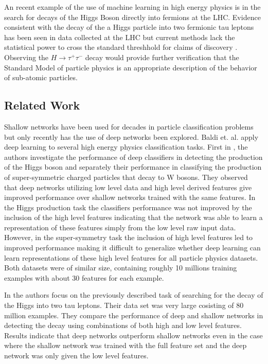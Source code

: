 \documentclass[12pt,letterpaper]{article}
\begin{document}
An recent example of the use of machine learning in high energy physics is in the search for decays of the Higgs Boson directly into fermions at the LHC.  Evidence consistent with the decay of the a Higgs particle into two fermionic tau leptons has been seen in data collected at the LHC but current methods lack the statistical power to cross the standard threshhold for claims of discovery \cite{pmlr-v42-cowa14}.  Observing the $H \rightarrow \tau^+ \tau^-$ decay would provide further verification that the Standard Model of particle physics is an appropriate description of the behavior of sub-atomic particles.

\subsection{Related Work}

Shallow networks have been used for decades in particle classification problems but only recently has the use of deep networks been explored.  Baldi et. al. \cite{Baldi:2014kfa}\cite{Baldi:2014pta} apply deep learning to several high energy physics classification tasks.  First in \cite{Baldi:2014kfa}, the authors investigate the performance of deep classifiers in detecting the production of the Higgs boson and separately their performance in classifying the production of super-symmetric charged particles that decay to W bosons.  They observed that deep networks utilizing low level data and high level derived features give improved performance over shallow networks trained with the same features.  In the Higgs production task the classifiers performance was not improved by the inclusion of the high level features indicating that the network was able to learn a representation of these features simply from the low level raw input data.  However, in the super-symmetry task the inclusion of high level features led to improved performance making it difficult to generalize whether deep learning can learn representations of these high level features for all particle physics datasets.  Both datasets were of similar size, containing roughly 10 millions training examples with about 30 features for each example.  

In \cite{Baldi:2014pta} the authors focus on the previously described task of searching for the decay of the Higgs into two tau leptons.  Their data set was very large cosisting of 80 million examples. They compare the performance of deep and shallow networks in detecting the decay using combinations of both high and low level features.  Results indicate that deep networks outperform shallow networks even in the case where the shallow network was trained with the full feature set and the deep network was only given the low level features.
\end{document}
